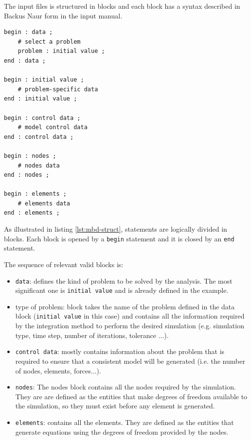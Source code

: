 The input files is structured in blocks and each block has a syntax described in Backus Naur form in the input manual.

\lstset{language=mbdyn}
\begin{lstlisting}[caption=MBDyn input file structure,label=lst:mbd-struct]
begin : data ;
    # select a problem
    problem : initial value ;
end : data ;

begin : initial value ;
    # problem-specific data
end : initial value ;

begin : control data ;
    # model control data
end : control data ;

begin : nodes ;
    # nodes data
end : nodes ;

begin : elements ;
    # elements data
end : elements ;
\end{lstlisting}

As illustrated in listing \ref{lst:mbd-struct}, statements are logically divided in blocks. Each block is opened by a \texttt{begin} statement and it is closed by an \texttt{end} statement.

The sequence of relevant valid blocks is:

\begin{itemize}
    \item \texttt{data}: defines the kind of problem to be solved by the analysis. The most significant one is \texttt{initial value} and is already defined in the example. 
    \item type of problem:  block takes the name of the problem defined in the data block (\texttt{initial value} in this case) and contains all the information required by the integration method to perform the desired simulation (e.g. simulation type, time step, number of iterations, tolerance ...).
    \item \texttt{control data}: mostly contains information about the problem that is required to ensure that a consistent model will be generated (i.e. the number of nodes, elements, forces...).
    \item \texttt{nodes}: The nodes block contains all the nodes required by the simulation. They are are defined as the entities that make degrees of freedom available to the simulation, so they must exist before any element is generated.
    \item \texttt{elements}: contains all the elements. They are defined as the entities that generate equations using the degrees of freedom provided by the nodes.
\end{itemize}

